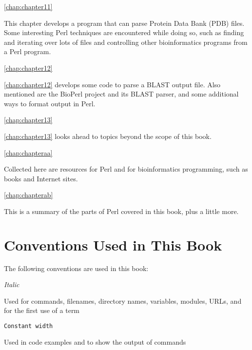 \autoref{chap:chapter11}
\begin{adjustwidth}{2em}{0cm}
This chapter develops a program that can parse Protein Data Bank (PDB) files. Some interesting Perl techniques are encountered while doing so, such as finding and iterating over lots of files and controlling other bioinformatics programs from a Perl program.
\end{adjustwidth}

\autoref{chap:chapter12}
\begin{adjustwidth}{2em}{0cm}
\autoref{chap:chapter12} develops some code to parse a BLAST output file. Also mentioned are the BioPerl project and its BLAST parser, and some additional ways to format output in Perl.
\end{adjustwidth}

\autoref{chap:chapter13}
\begin{adjustwidth}{2em}{0cm}
\autoref{chap:chapter13} looks ahead to topics beyond the scope of this book.
\end{adjustwidth}

\autoref{chap:chapteraa}
\begin{adjustwidth}{2em}{0cm}
Collected here are resources for Perl and for bioinformatics programming, such as books and Internet sites.
\end{adjustwidth}

\autoref{chap:chapterab}
\begin{adjustwidth}{2em}{0cm}
This is a summary of the parts of Perl covered in this book, plus a little more.
\end{adjustwidth}

\section*{Conventions Used in This Book}
The following conventions are used in this book:

\textit{Italic}
\begin{adjustwidth}{2em}{0cm}
Used for commands, filenames, directory names, variables, modules, URLs, and for the first use of a term 
\end{adjustwidth}

\texttt{Constant width}
\begin{adjustwidth}{2em}{0cm}
Used in code examples and to show the output of commands
\end{adjustwidth}


